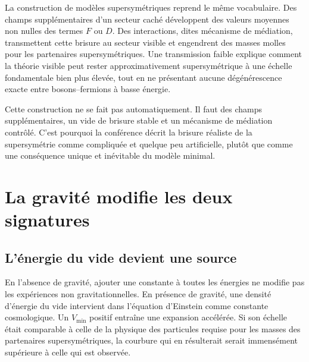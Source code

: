 La construction de modèles supersymétriques reprend le même vocabulaire. Des champs supplémentaires d’un secteur caché développent des valeurs moyennes non nulles des termes \(F\) ou \(D\). Des interactions, dites mécanisme de médiation, transmettent cette brisure au secteur visible et engendrent des masses molles pour les partenaires supersymétriques. Une transmission faible explique comment la théorie visible peut rester approximativement supersymétrique à une échelle fondamentale bien plus élevée, tout en ne présentant aucune dégénérescence exacte entre bosons--fermions à basse énergie.

Cette construction ne se fait pas automatiquement. Il faut des champs supplémentaires, un vide de brisure stable et un mécanisme de médiation contrôlé. C’est pourquoi la conférence décrit la brisure réaliste de la supersymétrie comme compliquée et quelque peu artificielle, plutôt que comme une conséquence unique et inévitable du modèle minimal.

\section{La gravité modifie les deux signatures}

\subsection{L’énergie du vide devient une source}

En l’absence de gravité, ajouter une constante à toutes les énergies ne modifie pas les expériences non gravitationnelles. En présence de gravité, une densité d’énergie du vide intervient dans l’équation d’Einstein comme constante cosmologique. Un \(V_{\min}\) positif entraîne une expansion accélérée. Si son échelle était comparable à celle de la physique des particules requise pour les masses des partenaires supersymétriques, la courbure qui en résulterait serait immensément supérieure à celle qui est observée.

\begin{classroomqa}\end{classroomqa}


